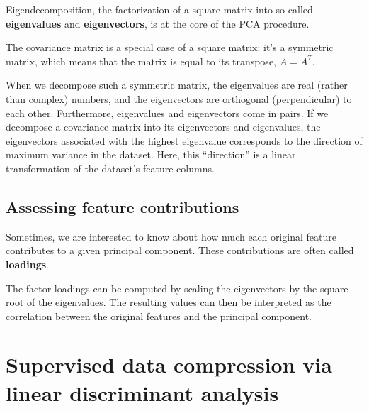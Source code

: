 \begin{tcolorbox}[title=Eigendecomposition: Decomposing a Matrix into Eigenvectors and Eigenvalues]

    Eigendecomposition, the factorization of a square matrix into so-called \textbf{eigenvalues} and \textbf{eigenvectors}, is at the core of the PCA procedure.

    The covariance matrix is a special case of a square matrix: it’s a symmetric matrix, which means that the matrix is equal to its transpose, $A = A^T$.

    When we decompose such a symmetric matrix, the eigenvalues are real (rather than complex) numbers, and the eigenvectors are orthogonal (perpendicular) to each other. Furthermore, eigenvalues and eigenvectors come in pairs. If we decompose a covariance matrix into its eigenvectors and eigenvalues, the eigenvectors associated with the highest eigenvalue corresponds to the direction of maximum variance in the dataset. Here, this “direction” is a linear transformation of the dataset’s feature columns.
\end{tcolorbox}
\subsection{Assessing feature contributions}
Sometimes, we are interested to know about how much each original feature contributes to a given principal component. These contributions are often called \textbf{loadings}.

The factor loadings can be computed by scaling the eigenvectors by the square root of the eigenvalues. The resulting values can then be interpreted as the correlation between the original features and the principal component.
\section{Supervised data compression via linear discriminant analysis}